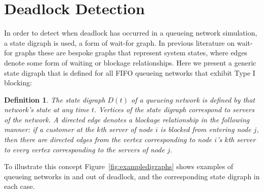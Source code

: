 \documentclass{article}
\newtheorem{definition}{Definition}
\numberwithin{equation}{section}
\begin{document}
\section{Deadlock Detection}\label{sec:detectingdeadlock}

In order to detect when deadlock has occurred in a queueing network
simulation, a state digraph is used, a form of wait-for graph.
In previous literature on wait-for graphs these are bespoke graphs that
represent system states, where edges denote some form of waiting or blockage
relationships.
Here we present a generic state digraph that is defined for all FIFO
queueing networks that exhibit Type I blocking:


\begin{definition}
The state digraph $D(t)$ of a queueing network is defined by that network's
state at any time $t$.
Vertices of the state digraph correspond to servers of the network.
A directed edge denotes a blockage relationship in the following manner: if a
customer at the $k$th server of node $i$ is blocked from entering node $j$,
then there are directed edges from the vertex corresponding to node $i$'s
$k$th server to every vertex corresponding to the servers of node $j$.
\end{definition}

To illustrate this concept Figure~\ref{fig:exampledigraphs} shows examples of
queueing networks in and out of deadlock, and the corresponding state digraph
in each case.
\end{document}
